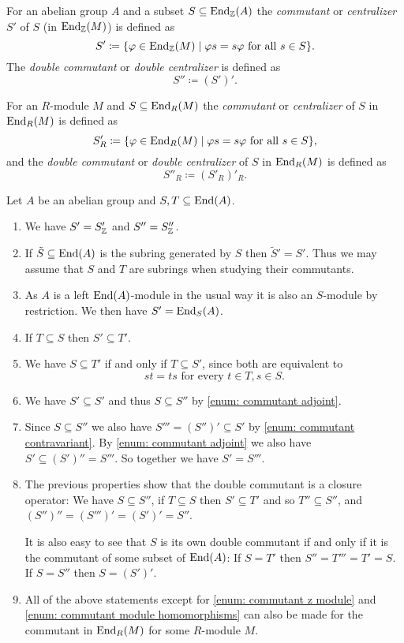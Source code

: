 \begin{defi}
 For an abelian group $A$ and a subset $S \subseteq \operatorname{End}_{\mathbb{Z}}(A)$ the \emph{commutant} or \emph{centralizer} $S'$ of $S$ (in $\operatorname{End}_{\mathbb{Z}}(M)$) is defined as
 \[
  S' \coloneqq \{ \varphi \in \operatorname{End}_{\mathbb{Z}}(M) \mid \varphi s = s \varphi \text{ for all } s \in S \}.
 \]
 The \emph{double commutant} or \emph{double centralizer} is defined as
 \[
  S'' \coloneqq (S')'.
 \]
 
 For an $R$-module $M$ and $S \subseteq \operatorname{End}_R(M)$ the \emph{commutant} or \emph{centralizer} of $S$ in $\operatorname{End}_R(M)$ is defined as
 \[
  S'_R \coloneqq \{ \varphi \in \operatorname{End}_R(M) \mid \varphi s = s \varphi \text{ for all } s \in S \},
 \]
 and the \emph{double commutant} or \emph{double centralizer} of $S$ in $\operatorname{End}_R(M)$ is defined as
 \[
  S''_R \coloneqq (S'_R)'_R.
 \]
\end{defi}


\begin{rem}
 Let $A$ be an abelian group and $S, T \subseteq \operatorname{End}(A)$.
 \begin{enumerate}[label=\emph{\alph*}),leftmargin=*]
  \item \label{enum: commutant z module}
   We have $S' = S'_{\mathbb{Z}}$ and $S'' = S''_{\mathbb{Z}}$.
  \item
   If $\tilde{S} \subseteq \operatorname{End}(A)$ is the subring generated by $S$ then $\tilde{S}' = S'$. Thus we may assume that $S$ and $T$ are subrings when studying their commutants.
  \item \label{enum: commutant module homomorphisms}
   As $A$ is a left $\operatorname{End}(A)$-module in the usual way it is also an $S$-module by restriction. We then have $S' = \operatorname{End}_S(A)$.
  \item \label{enum: commutant contravariant}
   If $T \subseteq S$ then $S' \subseteq T'$.
  \item \label{enum: commutant adjoint}
   We have $S \subseteq T'$ if and only if $T \subseteq S'$, since both are equivalent to
   \[
    st = ts \text{ for every } t \in T, s \in S.
   \]
  \item
   We have $S' \subseteq S'$ and thus $S \subseteq S''$ by \ref{enum: commutant adjoint}.
  \item
   Since $S \subseteq S''$ we also have $S''' = (S'')' \subseteq S'$ by \ref{enum: commutant contravariant}. By \ref{enum: commutant adjoint} we also have $S' \subseteq (S')'' = S'''$. So together we have $S' = S'''$.
  \item
   The previous properties show that the double commutant is a closure operator: We have $S \subseteq S''$, if $T \subseteq S$ then $S' \subseteq T'$ and so $T'' \subseteq S''$, and $(S'')'' = (S''')' = (S')' = S''$.
   
   It is also easy to see that $S$ is its own double commutant if and only if it is the commutant of some subset of $\operatorname{End}(A)$: If $S = T'$ then $S'' = T''' = T' = S$. If $S = S''$ then $S = (S')'$.
  \item
   All of the above statements except for \ref{enum: commutant z module} and \ref{enum: commutant module homomorphisms} can also be made for the commutant in $\operatorname{End}_R(M)$ for some $R$-module $M$.
 \end{enumerate}
\end{rem}


